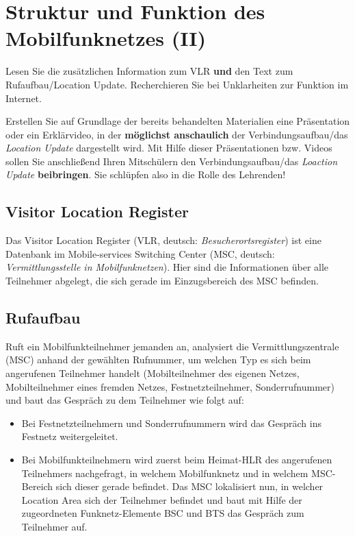 \documentclass[loesung]{schulein}
\begin{document}
 
%
\section*{Struktur und Funktion des Mobilfunknetzes (II)}
\vspace*{-1cm}
\begin{aufgaben}
\item Lesen Sie die zusätzlichen Information zum VLR \textbf{und} den Text zum Rufaufbau/Location Update. Recherchieren Sie bei Unklarheiten zur Funktion im Internet. 
\item Erstellen Sie auf Grundlage der bereits behandelten Materialien eine Präsentation oder ein Erklärvideo, in der \textbf{möglichst anschaulich} der Verbindungsaufbau/das \textit{Location Update} dargestellt wird. Mit Hilfe dieser Präsentationen bzw. Videos sollen Sie anschließend Ihren Mitschülern den Verbindungsaufbau/das \textit{Loaction Update} \textbf{beibringen}. Sie schlüpfen also in die Rolle des Lehrenden!

\end{aufgaben}
%
\subsection*{Visitor Location Register}
Das Visitor Location Register (VLR, deutsch: \textit{Besucherortsregister}) ist eine Datenbank im Mobile-services Switching Center (MSC, deutsch: \textit{Vermittlungsstelle in Mobilfunknetzen}). Hier sind die Informationen über alle Teilnehmer abgelegt, die sich gerade im Einzugsbereich des MSC befinden.

\subsection*{Rufaufbau}
Ruft ein Mobilfunkteilnehmer jemanden an, analysiert die Vermittlungszentrale (MSC) anhand der gewählten Rufnummer, um welchen Typ es sich beim angerufenen Teilnehmer handelt (Mobilteilnehmer des eigenen Netzes, Mobilteilnehmer eines fremden Netzes, Festnetzteilnehmer, Sonderrufnummer) und baut das Gespräch zu dem Teilnehmer wie folgt auf: 
\begin{itemize}
\item Bei Festnetzteilnehmern und Sonderrufnummern wird das Gespräch ins Festnetz weitergeleitet.
\item Bei Mobilfunkteilnehmern wird zuerst beim Heimat-HLR des angerufenen Teilnehmers nachgefragt, in welchem Mobilfunknetz und in welchem MSC-Bereich sich dieser gerade befindet. Das MSC lokalisiert nun, in welcher Location Area sich der Teilnehmer befindet und baut mit Hilfe der zugeordneten Funknetz-Elemente BSC und BTS das Gespräch zum Teilnehmer auf.
\end{itemize}
	
\end{document}
